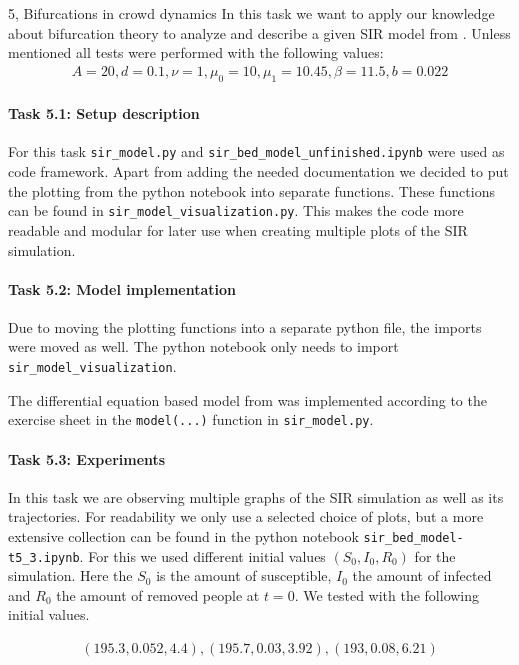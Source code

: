 \begin{task}{5, Bifurcations in crowd dynamics}
In this task we want to apply our knowledge about bifurcation theory to analyze and describe a given SIR model from \cite{shan2014bifurcations}. Unless mentioned all tests were performed with the following values:
\begin{align*}
    A = 20,
    d = 0.1,
    \nu = 1,
    \mu_0 = 10,
    \mu_1 = 10.45,
    \beta = 11.5,
    b = 0.022
\end{align*}

\paragraph{Task 5.1: Setup description}
For this task \verb|sir_model.py| and \verb|sir_bed_model_unfinished.ipynb| were used as code framework. Apart from adding the needed documentation we decided to put the plotting from the python notebook into separate functions. These functions can be found in \verb|sir_model_visualization.py|. This makes the code more readable and modular for later use when creating multiple plots of the SIR simulation.

\paragraph{Task 5.2: Model implementation}
Due to moving the plotting functions into a separate python file, the imports were moved as well. The python notebook only needs to import \verb|sir_model_visualization|.

The differential equation based model from \cite{shan2014bifurcations} was implemented according to the exercise sheet in the \verb|model(...)| function in \verb|sir_model.py|.

\paragraph{Task 5.3: Experiments}
In this task we are observing multiple graphs of the SIR simulation as well as its trajectories. For readability we only use a selected choice of plots, but a more extensive collection can be found in the python notebook \verb|sir_bed_model-t5_3.ipynb|. For this we used different initial values $(S_0, I_0, R_0 )$ for the simulation. Here the $S_0$ is the amount of susceptible, $I_0$ the amount of infected and $R_0$ the amount of removed people at $t=0$. We tested with the following initial values.

\begin{align*}
    (195.3,0.052,4.4), (195.7, 0.03, 3.92), (193, 0.08, 6.21)
\end{align*}


\end{task}
